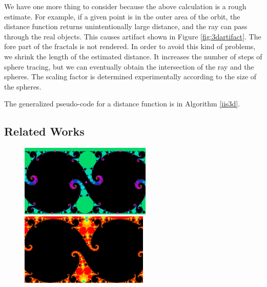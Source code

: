 We have one more thing to consider because the above calculation is
a rough estimate.
For example, if a given point is in the outer area of the orbit, the
distance function returns unintentionally large distance, and the ray
can pass through the real objects. This causes artifact shown in Figure
\ref{fig:3dartifact}. The fore part of the fractals is not rendered.
In order to avoid this kind of problems, we shrink the length of
the estimated distance.
It increases the number of steps of sphere tracing, but we can
eventually obtain the intersection of the ray and the spheres.
The scaling factor is determined experimentally according to the size of
the spheres.

The generalized pseudo-code for a distance function is in Algorithm \ref{iis3d}. 

\subsection{Related Works}

\begin{figure}[htbp]
 \begin{minipage}[t]{0.5\hsize}
  \center
  \includegraphics[height=1.35in, keepaspectratio]{img/preparation/related/josklein.png}
  \caption{\textit{}}
  \label{fig:jos}
  \hspace*{\fill}
 \end{minipage}
 \begin{minipage}[t]{0.5\hsize}
  \center
  \includegraphics[height=1.35in, keepaspectratio]{img/preparation/related/joskleinInv.png}
  \caption{\textit{}}
  \label{fig:josInv}
  \hspace*{\fill}
 \end{minipage}
\end{figure}

